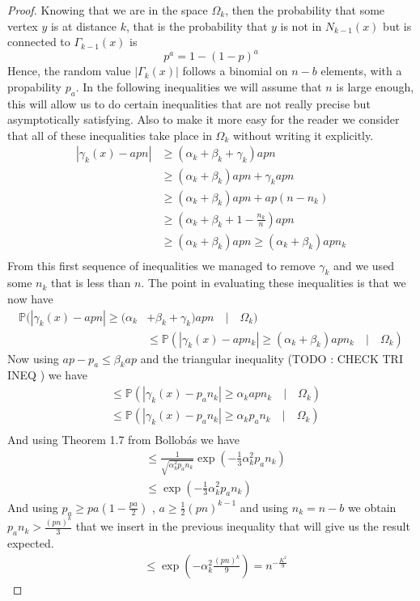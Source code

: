 \begin{proof}
	Knowing that we are in the space $\Omega_k$, then the probability that some vertex $y$ is at distance $k$, that is the probability that $y$ is not in $N_{k-1}(x)$ but is connected to $\Gamma_{k-1}(x)$ is 
	\begin{equation}
		p^a = 1 - (1-p)^a
	\end{equation}
	Hence, the random value $|\Gamma_k(x)|$ follows a binomial on $n-b$ elements, with a propability $p_a$.
	In the following inequalities we will assume that $n$ is large enough, this will allow us to do certain inequalities that are not really precise but asymptotically satisfying. Also to make it more easy for the reader we consider that all of these inequalities take place in $\Omega_k$ without writing it explicitly.
	\begin{align}
		|\gamma_k(x) - apn| &\geq (\alpha_k + \beta_k + \gamma_k)apn \\
		 &\geq (\alpha_k + \beta_k)apn + \gamma_k apn \\
		 &\geq (\alpha_k + \beta_k)apn + ap(n-n_k) \\ 
		 &\geq (\alpha_k + \beta_k + 1 - \frac{n_k}{n})apn \\ 
		 &\geq (\alpha_k + \beta_k)apn \geq (\alpha_k + \beta_k)apn_k\\ 
	\end{align}
	From this first sequence of inequalities we managed to remove $\gamma_k$ and we used some $n_k$ that is less than $n$.
	The point in evaluating these inequalities is that we now have
	\begin{align}
		\mathbb{P}(|\gamma_k(x) - apn| \geq (\alpha_k &+ \beta_k + \gamma_k)apn \quad|\quad \Omega_k) \\&\leq \mathbb{P}(|\gamma_k(x) - apn_k| \geq (\alpha_k + \beta_k )apn_k \quad|\quad \Omega_k)
	\end{align}
	Now using $ap -p_a \leq \beta_k ap$ and the triangular inequality (TODO : CHECK TRI INEQ ) we have
	\begin{align}
		&\leq \mathbb{P}(|\gamma_k(x) - p_an_k| \geq \alpha_k apn_k \quad|\quad \Omega_k)\\
		&\leq \mathbb{P}(|\gamma_k(x) - p_an_k| \geq \alpha_k p_an_k \quad|\quad \Omega_k)\\
	\end{align}
	And using Theorem 1.7 from Bollob\'as we have
	\begin{align}
		&\leq \frac{1}{\sqrt{\alpha_k^2p_an_k}}\exp(-\frac{1}{3}\alpha_k^2p_an_k) \\
		&\leq \exp(-\frac{1}{3}\alpha_k^2p_an_k)
	\end{align}
	And using $p_a \geq pa(1-\frac{pa}{2})$ , $a \geq \frac{1}{2}(pn)^{k-1}$ and using $n_k = n-b$ we obtain $p_an_k > \frac{(pn)^k}{3}$ that we insert in the previous inequality that will give us the result expected.
	\begin{align}
		&\leq \exp(-\alpha_k^2\frac{(pn)^k}{9}) = n^{-\frac{K^2}{9}}
	\end{align}
\end{proof}
